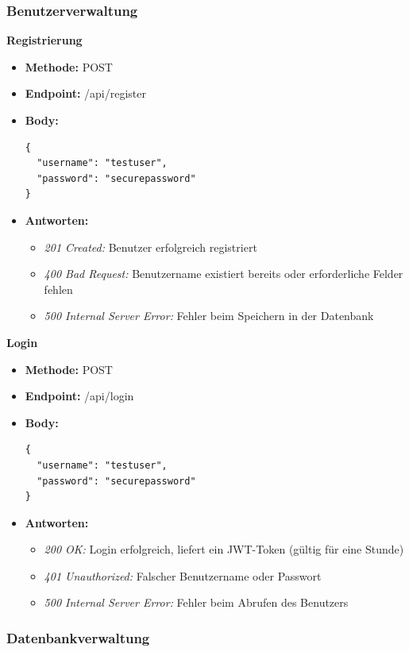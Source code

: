 \subsubsection{Benutzerverwaltung}

\textbf{Registrierung}
\begin{itemize}
    \item \textbf{Methode: }POST 
    \item \textbf{Endpoint: }/api/register 
    \item \textbf{Body: } \begin{verbatim}
{
  "username": "testuser",
  "password": "securepassword"
}
    \end{verbatim}
    \item \textbf{Antworten: }
    \begin{itemize}
        \item \textit{201 Created: }Benutzer erfolgreich registriert
        \item \textit{400 Bad Request: }Benutzername existiert bereits oder erforderliche Felder fehlen
        \item \textit{500 Internal Server Error: }Fehler beim Speichern in der Datenbank
    \end{itemize}
\end{itemize}
\textbf{Login}
\begin{itemize}
    \item \textbf{Methode: }POST 
    \item \textbf{Endpoint: }/api/login  
    \item \textbf{Body: } \begin{verbatim}
{
  "username": "testuser",
  "password": "securepassword"
}
    \end{verbatim}
    \item \textbf{Antworten: }
    \begin{itemize}
        \item \textit{200 OK: }Login erfolgreich, liefert ein JWT-Token (gültig für eine Stunde)
        \item \textit{401 Unauthorized: }Falscher Benutzername oder Passwort
        \item \textit{500 Internal Server Error: }Fehler beim Abrufen des Benutzers
    \end{itemize}
\end{itemize}


\subsubsection{Datenbankverwaltung}

